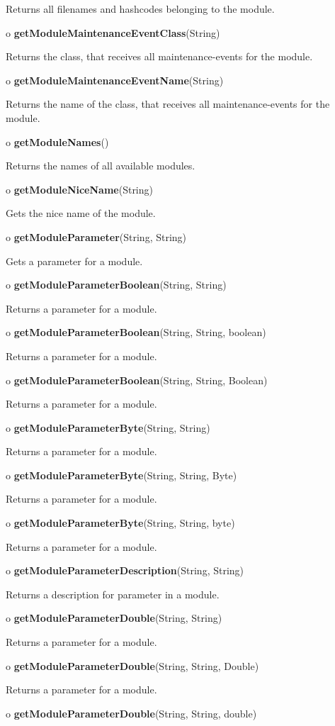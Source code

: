 \begin{description}
Returns all filenames and hashcodes belonging to the module.  
\item o {\bf getModuleMaintenanceEventClass}(String)  

Returns the class, that receives all maintenance-events for the module.  
\item o {\bf getModuleMaintenanceEventName}(String)  

Returns the name of the class, that receives all maintenance-events for the
module.  
\item o {\bf getModuleNames}()  

Returns the names of all available modules.  
\item o {\bf getModuleNiceName}(String)  

Gets the nice name of the module.  
\item o {\bf getModuleParameter}(String, String)  

Gets a parameter for a module.  
\item o {\bf getModuleParameterBoolean}(String, String)  

Returns a parameter for a module.  
\item o {\bf getModuleParameterBoolean}(String, String, boolean)  

Returns a parameter for a module.  
\item o {\bf getModuleParameterBoolean}(String, String, Boolean)  

Returns a parameter for a module.  
\item o {\bf getModuleParameterByte}(String, String)  

Returns a parameter for a module.  
\item o {\bf getModuleParameterByte}(String, String, Byte)  

Returns a parameter for a module.  
\item o {\bf getModuleParameterByte}(String, String, byte)  

Returns a parameter for a module.  
\item o {\bf getModuleParameterDescription}(String, String)  

Returns a description for parameter in a module.  
\item o {\bf getModuleParameterDouble}(String, String)  

Returns a parameter for a module.  
\item o {\bf getModuleParameterDouble}(String, String, Double)  

Returns a parameter for a module.  
\item o {\bf getModuleParameterDouble}(String, String, double)  


\end{description}
